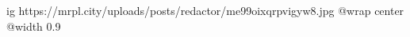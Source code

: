  
 
 
 
 

\ifcmt
  ig https://mrpl.city/uploads/posts/redactor/me99oixqrpvigyw8.jpg
  @wrap center
  @width 0.9
\fi
